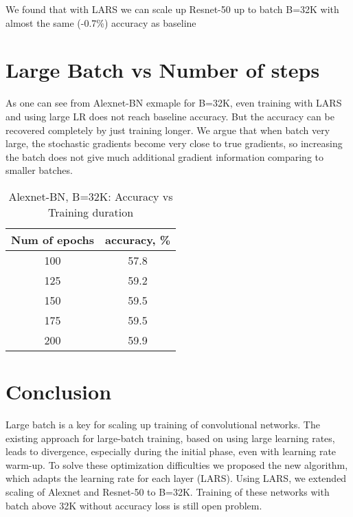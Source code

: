 \documentclass{article} %
\begin{document}
 We found that with LARS we can scale up Resnet-50 up to batch B=32K with almost the same (-0.7\%) accuracy as baseline
 
\section{Large Batch vs Number of steps}
As one can see from Alexnet-BN exmaple for B=32K, even training with LARS  and using large LR does not reach baseline accuracy. But the accuracy can be recovered completely by just training longer. We argue that when batch very large, the stochastic gradients become very close to true gradients, so increasing the batch does not give much additional gradient information comparing to smaller batches. 

\begin{table}[htb!]
  \caption{Alexnet-BN, B=32K: Accuracy vs Training duration}
  \label{tab:alexnetbn_acc_vs_epochs}
  \centering
  \vspace{3pt}
  \begin{tabular}{|c|c|}
  \hline Num of epochs & accuracy, \% \\
  \hline  100   &  57.8 \\
  \hline  125   &  59.2 \\
  \hline  150   &  59.5 \\
  \hline  175   &  59.5 \\
  \hline  200   &  59.9 \\
  \hline
  \end{tabular}
\end{table}




\section{Conclusion}
\label{sec:conclusion}
Large batch is a key for scaling up training of convolutional networks. 
The existing approach for large-batch training, based on using large learning rates, leads to divergence, especially during the initial phase, even with learning rate warm-up.  To solve these optimization  difficulties we proposed the new algorithm, which adapts the learning rate  for each layer (LARS). Using LARS, we extended scaling of Alexnet and Resnet-50 to B=32K. Training of these networks with batch above 32K without accuracy loss is still open problem.
\end{document}
